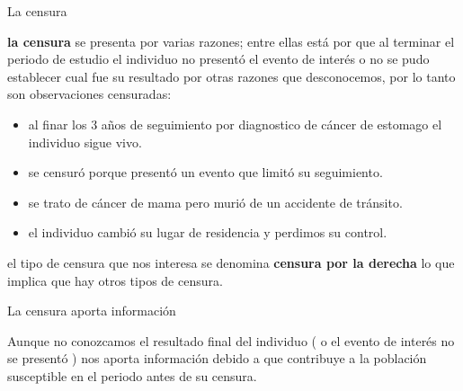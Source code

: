 \documentclass{beamer}
\begin{document}
\begin{frame}{La censura}

 \textbf{la censura} se presenta por varias razones; entre ellas está por que al terminar el periodo de estudio el individuo no presentó el evento de interés o no se pudo establecer cual fue su resultado por otras razones que desconocemos, por lo tanto son observaciones censuradas:
 

\begin{itemize}

 \item  al finar  los 3 años de seguimiento por diagnostico de cáncer de estomago el individuo sigue vivo.

 \item  se censuró porque  presentó un evento que limitó su seguimiento.
 
 \item se trato de cáncer de mama pero  murió de un accidente de tránsito. 
 
 \item  el individuo cambió su lugar de residencia y perdimos su control.




\end{itemize}
 
el  tipo de censura que  nos interesa se denomina \textbf{ censura por la derecha} lo que implica que hay otros tipos de censura. 


\end{frame}


\begin{frame}{La censura aporta información}

Aunque no conozcamos el resultado final del individuo ( o el evento de interés no se presentó ) nos aporta información debido a que contribuye a la  población susceptible en el periodo antes de su censura. 


\end{frame}
\end{document}
